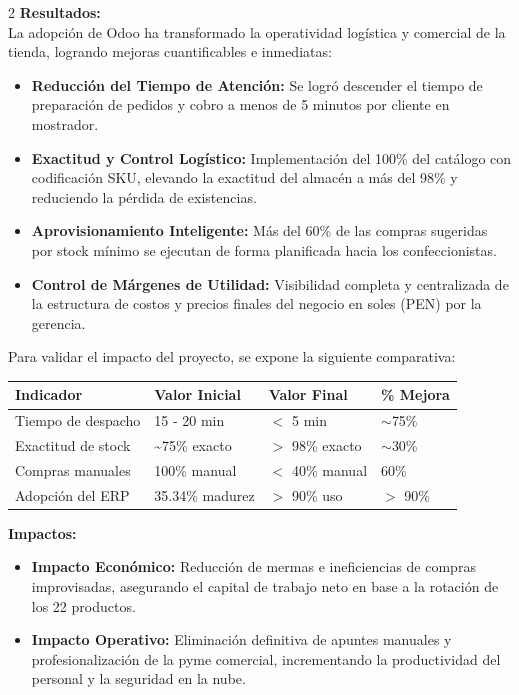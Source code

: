 \documentclass[12pt]{article}
\begin{document}
\begin{multicols}{2}
\textbf{Resultados:}\\
La adopción de Odoo ha transformado la operatividad logística y comercial de la tienda, logrando mejoras cuantificables e inmediatas:
\begin{itemize}
    \item \textbf{Reducción del Tiempo de Atención:} Se logró descender el tiempo de preparación de pedidos y cobro a menos de 5 minutos por cliente en mostrador.
    \item \textbf{Exactitud y Control Logístico:} Implementación del 100\% del catálogo con codificación SKU, elevando la exactitud del almacén a más del 98\% y reduciendo la pérdida de existencias.
    \item \textbf{Aprovisionamiento Inteligente:} Más del 60\% de las compras sugeridas por stock mínimo se ejecutan de forma planificada hacia los confeccionistas.
    \item \textbf{Control de Márgenes de Utilidad:} Visibilidad completa y centralizada de la estructura de costos y precios finales del negocio en soles (PEN) por la gerencia.
\end{itemize}

Para validar el impacto del proyecto, se expone la siguiente comparativa:
\vspace{0.2cm}
\begin{center}
\scriptsize
\renewcommand{\arraystretch}{1.15}
\setlength{\tabcolsep}{3pt}
\begin{tabular}{|p{1.85cm}|p{1.65cm}|p{1.45cm}|p{1.15cm}|}
\hline
\textbf{Indicador} & \centering\textbf{Valor Inicial} & \centering\textbf{Valor Final} & \centering\textbf{\% Mejora}\tabularnewline \hline
Tiempo de despacho & 15 - 20 min & $<$ 5 min & $\sim$75\% \\ \hline
Exactitud de stock & \textasciitilde75\% exacto & $>$ 98\% exacto & $\sim$30\% \\ \hline
Compras manuales & 100\% manual & $<$ 40\% manual & 60\% \\ \hline
Adopción del ERP & 35.34\% madurez & $>$ 90\% uso & $>$ 90\% \\ \hline
\end{tabular}
\normalsize
\end{center}

\textbf{Impactos:}
\begin{itemize}
    \item \textbf{Impacto Económico:} Reducción de mermas e ineficiencias de compras improvisadas, asegurando el capital de trabajo neto en base a la rotación de los 22 productos.
    \item \textbf{Impacto Operativo:} Eliminación definitiva de apuntes manuales y profesionalización de la pyme comercial, incrementando la productividad del personal y la seguridad en la nube.
\end{itemize}


\end{multicols}
\end{document}
